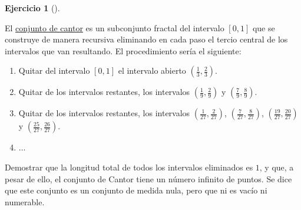 \documentclass[
  a4paper,
]{scrreport}
\providecommand{\tightlist}{%
  \setlength{\itemsep}{0pt}\setlength{\parskip}{0pt}}\usepackage{longtable,booktabs,array}
\theoremstyle{definition}
\newtheorem{exercise}{Ejercicio}[chapter]
\theoremstyle{remark}
\begin{document}
\leavevmode{}%
\begin{exercise}[]\label{exr-serie-conjunto-cantor}

El \href{https://es.wikipedia.org/wiki/Conjunto_de_Cantor}{conjunto de
cantor} es un subconjunto fractal del intervalo \([0,1]\) que se
construye de manera recursiva eliminando en cada paso el tercio central
de los intervalos que van resultando. El procedimiento sería el
siguiente:

\begin{enumerate}
\def\labelenumi{\arabic{enumi}.}
\tightlist
\item
  Quitar del intervalo \([0,1]\) el intervalo abierto
  \(\left(\frac{1}{3},\frac{2}{3}\right)\).
\item
  Quitar de los intervalos restantes, los intervalos
  \(\left(\frac{1}{9},\frac{2}{9}\right)\) y
  \(\left(\frac{7}{9},\frac{8}{9}\right)\).
\item
  Quitar de los intervalos restantes, los intervalos
  \(\left(\frac{1}{27},\frac{2}{27}\right)\),
  \(\left(\frac{7}{27},\frac{8}{27}\right)\),
  \(\left(\frac{19}{27},\frac{20}{27}\right)\) y
  \(\left(\frac{25}{27},\frac{26}{27}\right)\).
\item
  \(\ldots\)
\end{enumerate}

Demostrar que la longitud total de todos los intervalos eliminados es
\(1\), y que, a pesar de ello, el conjunto de Cantor tiene un número
infinito de puntos. Se dice que este conjunto es un conjunto de medida
nula, pero que ni es vacío ni numerable.

\end{exercise}
\end{document}
